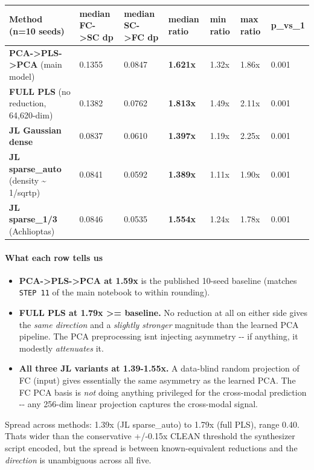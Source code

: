 {\def\LTcaptype{none} %
\begin{longtable}[]{@{}lllllll@{}}
\toprule\noalign{}
Method (n=10 seeds) & median FC-\textgreater SC dp & median SC-\textgreater FC dp & \textbf{median ratio} & min ratio & max ratio & p\_vs\_1 \\
\midrule\noalign{}
\endhead
\bottomrule\noalign{}
\endlastfoot
\textbf{PCA-\textgreater PLS-\textgreater PCA} (main model) & 0.1355 & 0.0847 & \textbf{1.621x} & 1.32x & 1.86x & 0.001 \\
\textbf{FULL PLS} (no reduction, 64,620-dim) & 0.1382 & 0.0762 & \textbf{1.813x} & 1.49x & 2.11x & 0.001 \\
\textbf{JL Gaussian dense} & 0.0837 & 0.0610 & \textbf{1.397x} & 1.19x & 2.25x & 0.001 \\
\textbf{JL sparse\_auto} (density \textasciitilde{} 1/sqrtp) & 0.0841 & 0.0592 & \textbf{1.389x} & 1.11x & 1.90x & 0.001 \\
\textbf{JL sparse\_1/3} (Achlioptas) & 0.0846 & 0.0535 & \textbf{1.554x} & 1.24x & 1.78x & 0.001 \\
\end{longtable}
}

\paragraph{What each row tells us}\label{what-each-row-tells-us}

\begin{itemize}
\tightlist
\item
  \textbf{PCA-\textgreater PLS-\textgreater PCA at 1.59x} is the published 10-seed baseline (matches \texttt{STEP\ 11} of the main notebook to within rounding).
\item
  \textbf{FULL PLS at 1.79x \textgreater= baseline.} No reduction at all on either side gives the \emph{same direction} and a \emph{slightly stronger} magnitude than the learned PCA pipeline. The PCA preprocessing isn\textquotesingle t injecting asymmetry -\/- if anything, it modestly \emph{attenuates} it.
\item
  \textbf{All three JL variants at 1.39-1.55x.} A data-blind random projection of FC (input) gives essentially the same asymmetry as the learned PCA. The FC PCA basis is \emph{not} doing anything privileged for the cross-modal prediction -\/- any 256-dim linear projection captures the cross-modal signal.
\end{itemize}

Spread across methods: 1.39x (JL sparse\_auto) to 1.79x (full PLS), range 0.40. That\textquotesingle s wider than the conservative +/-0.15x CLEAN threshold the synthesizer script encoded, but the spread is between known-equivalent reductions and the \emph{direction} is unambiguous across all five.

